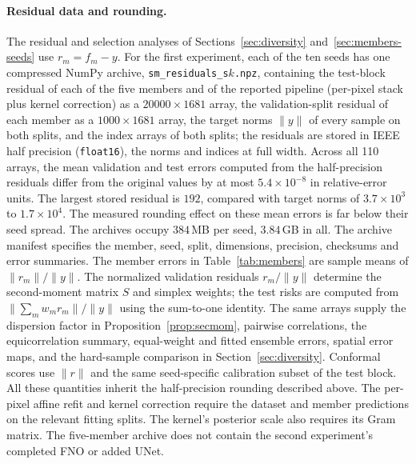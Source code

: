 \paragraph{Residual data and rounding.} The residual and selection analyses
of Sections~\ref{sec:diversity} and~\ref{sec:members-seeds} use
$r_m=f_m-y$. For the first experiment, each of the ten seeds has one compressed NumPy archive,
\texttt{sm\_residuals\_s$k$.npz}, containing the test-block residual of each of the
five members and of the reported pipeline (per-pixel stack plus kernel
correction) as a $20000\times1681$ array, the validation-split residual of each
member as a $1000\times1681$ array, the target norms $\|y\|$ of every sample on
both splits, and the index arrays of both splits; the residuals are stored in
IEEE half precision (\texttt{float16}), the norms and indices at full width.
Across all 110 arrays, the mean validation and test errors computed
from the half-precision residuals differ from the original values by at most
$5.4\times10^{-8}$ in relative-error units. The largest stored residual
is $192$, compared with target norms of $3.7\times10^3$ to
$1.7\times10^4$. The measured rounding effect on these mean errors is far
below their seed spread. The archives occupy $384$\,MB per seed, $3.84$\,GB in all.
The archive manifest specifies the member, seed, split, dimensions,
precision, checksums and error summaries. The member errors in
Table~\ref{tab:members} are sample means of $\|r_m\|/\|y\|$. The
normalized validation residuals $r_m/\|y\|$ determine the second-moment
matrix $S$ and simplex weights; the test risks are computed from
$\|\sum_m w_m r_m\|/\|y\|$ using the sum-to-one identity. The same arrays
supply the dispersion factor in Proposition~\ref{prop:secmom}, pairwise
correlations, the equicorrelation summary, equal-weight and fitted
ensemble errors, spatial error maps, and the hard-sample comparison in
Section~\ref{sec:diversity}. Conformal scores use $\|r\|$ and the same
seed-specific calibration subset of the test block. All these quantities
inherit the half-precision rounding described above.
The per-pixel affine refit and kernel correction require the dataset and
member predictions on the relevant fitting splits. The kernel's posterior scale also requires its Gram matrix.
The five-member archive
does not contain the second experiment's completed FNO or added UNet.

